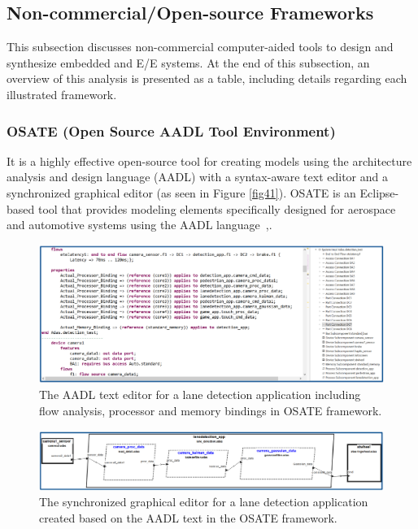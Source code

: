 \subsection{Non-commercial/Open-source Frameworks}
 This subsection discusses non-commercial computer-aided tools to design and synthesize embedded and E/E systems. At the end of this subsection, an overview of this analysis is presented as a table, including details regarding each illustrated framework.
 
\subsubsection{OSATE (Open Source AADL Tool Environment)} 
It is a highly effective open-source tool for creating models using the architecture analysis and design language (AADL) with a syntax-aware text editor and a synchronized graphical editor (as seen in Figure \ref{fig41})\cite{askaripoor2022architecture}. OSATE is an Eclipse-based tool that provides modeling elements specifically designed for aerospace and automotive systems using the AADL language~\cite{feiler2019open},\cite{osate}.

\begin{figure}[ht]
\centering
\includegraphics[width=1\textwidth]{figures/osateProject.pdf}
\caption{ The AADL text editor for a lane detection application including flow analysis, processor and memory bindings in OSATE framework.}
\label{fig042}
\end{figure}


\begin{figure}[ht]
\centering
\includegraphics[width=1\textwidth]{figures/osateProject1.pdf}
\caption{ The synchronized graphical editor for a lane detection application created based on the AADL text in the OSATE framework.}
\label{fig0043}
\end{figure}

